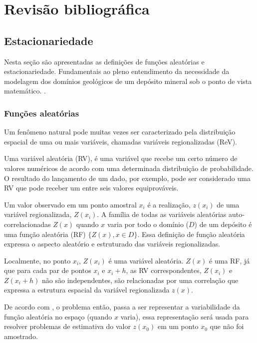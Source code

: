\chapter{Revisão bibliográfica}

\section{Estacionariedade}
		
Nesta seção são apresentadas as definições de funções aleatórias e estacionariedade. Fundamentais ao pleno entendimento da necessidade da modelagem dos domínios geológicos de um depósito mineral sob o ponto de vista matemático. \cite{matheron1965variables, journel1978mining, armstrong1998basic}.
	
\subsection{Funções aleatórias}\label{func_al}
			
Um fenômeno natural pode muitas vezes ser caracterizado pela distribuição espacial de uma ou mais variáveis, chamadas variáveis regionalizadas (ReV).
			
Uma variável aleatória (RV), é uma variável que recebe um certo número de valores numéricos de acordo com uma determinada distribuição de probabilidade. O resultado do lançamento de um dado, por exemplo, pode ser considerado uma RV que pode receber um entre seis valores equiprováveis. 
			
Um valor observado em um ponto amostral $x_i$ é  a realização, $z(x_i)$ de uma variável regionalizada, $Z(x_i)$. A família de todas as variáveis aleatórias auto-correlacionadas $Z(x)$ quando $x$ varia por todo o domínio ($D$) de um depósito é uma função aleatória (RF) $\{Z(x),x\in D\}$. Essa definição de função aleatória expressa o aspecto aleatório e estruturado das variáveis regionalizadas.

Localmente, no ponto $x_i$, $Z(x_i)$ é uma variável aleatória. $Z(x)$ é uma RF, já que para cada par de pontos $x_i$ e $x_i+h$, as RV correspondentes, $Z(x_i)$ e $Z(x_i+h)$ não são independentes, são relacionadas por uma correlação que expressa a estrutura espacial da variável regionalizada $z(x)$.
			 
De acordo com , o problema então, passa a ser representar a variabilidade da função aleatória no espaço (quando $x$ varia), essa representação será usada para resolver problemas de estimativa do valor $z(x_0)$ em um ponto $x_0$ que não foi amostrado.
			
